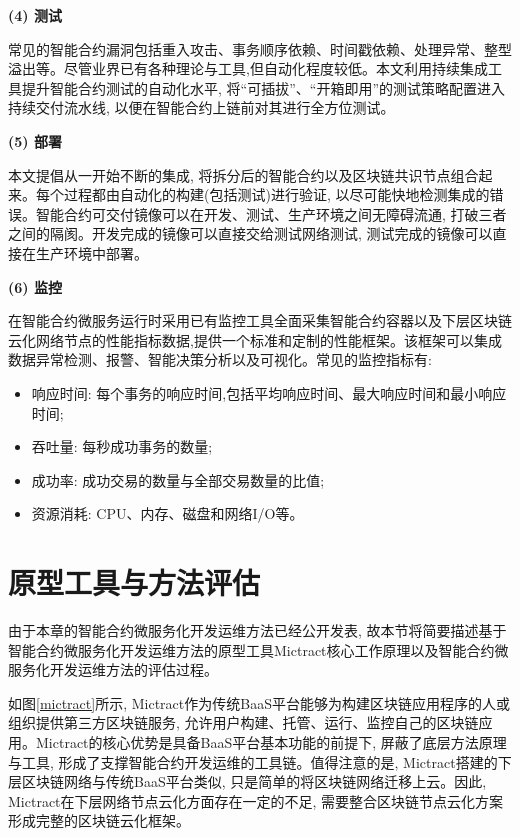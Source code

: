 \textbf{(4) 测试}

常见的智能合约漏洞包括重入攻击、事务顺序依赖、时间戳依赖、处理异常、整型溢出等。尽管业界已有各种理论与工具\cite{luu2016making},但自动化程度较低。本文利用持续集成工具提升智能合约测试的自动化水平, 将“可插拔”、“开箱即用”的测试策略配置进入持续交付流水线, 以便在智能合约上链前对其进行全方位测试。

\textbf{(5) 部署}

本文提倡从一开始不断的集成, 将拆分后的智能合约以及区块链共识节点组合起来。每个过程都由自动化的构建(包括测试)进行验证, 以尽可能快地检测集成的错误。智能合约可交付镜像可以在开发、测试、生产环境之间无障碍流通, 打破三者之间的隔阂。开发完成的镜像可以直接交给测试网络测试, 测试完成的镜像可以直接在生产环境中部署。

\textbf{(6) 监控}

在智能合约微服务运行时采用已有监控工具全面采集智能合约容器以及下层区块链云化网络节点的性能指标数据,提供一个标准和定制的性能框架。该框架可以集成数据异常检测、报警、智能决策分析以及可视化。常见的监控指标有:
\begin{itemize}[itemindent=2em]
    \item  响应时间: 每个事务的响应时间,包括平均响应时间、最大响应时间和最小响应时间;

    \item 吞吐量: 每秒成功事务的数量;

    \item 成功率: 成功交易的数量与全部交易数量的比值;

    \item 资源消耗: CPU、内存、磁盘和网络I/O等。

\end{itemize}

\section{原型工具与方法评估}\label{section: smart_contract_microservice_test}

由于本章的智能合约微服务化开发运维方法已经公开发表, 故本节将简要描述基于智能合约微服务化开发运维方法的原型工具Mictract核心工作原理以及智能合约微服务化开发运维方法的评估过程。

如图\ref{mictract}所示, Mictract\footnotemark[1]\footnotemark[2]作为传统BaaS平台能够为构建区块链应用程序的人或组织提供第三方区块链服务, 允许用户构建、托管、运行、监控自己的区块链应用。Mictract的核心优势是具备BaaS平台基本功能的前提下, 屏蔽了底层方法原理与工具, 形成了支撑智能合约开发运维的工具链。值得注意的是, Mictract搭建的下层区块链网络与传统BaaS平台类似, 只是简单的将区块链网络迁移上云。因此, Mictract在下层网络节点云化方面存在一定的不足, 需要整合区块链节点云化方案形成完整的区块链云化框架。

